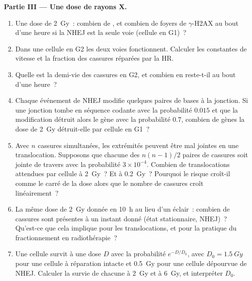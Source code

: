 \begin{problem}
\medskip
\noindent\textbf{Partie III --- Une dose de rayons X.}
\begin{enumerate}[resume]
  \item Une dose de \qty{2}{Gy}~: combien de , et
        combien de foyers de $\gamma$-H2AX au bout d'une heure si la
        NHEJ est la seule voie (cellule en G1)~?
  \item Dans une cellule en G2 les deux voies fonctionnent. Calculer
        les constantes de vitesse et la fraction des cassures réparées
        par la HR.
  \item Quelle est la demi-vie des cassures en G2, et combien en
        reste-t-il au bout d'une heure~?
  \item Chaque événement de NHEJ modifie quelques paires de bases à la
        jonction. Si une jonction tombe en séquence codante avec la
        probabilité $0.015$ et que la modification détruit alors le
        gène avec la probabilité $0.7$, combien de gènes la dose de
        \qty{2}{Gy} détruit-elle par cellule en G1~?
  \item Avec $n$ cassures simultanées, les extrémités peuvent être mal
        jointes en une translocation. Supposons que chacune des
        $n(n-1)/2$ paires de cassures soit jointe de travers avec la
        probabilité $3\times 10^{-4}$. Combien de translocations
        attendues par cellule à \qty{2}{Gy}~? Et à \qty{0.2}{Gy}~?
        Pourquoi le risque croît-il comme le carré de la dose alors que
        le nombre de cassures croît linéairement~?
  \item La même dose de \qty{2}{Gy} donnée en \qty{10}{h} au lieu d'un
        éclair~: combien de cassures sont présentes à un instant donné
        (état stationnaire, NHEJ)~? Qu'est-ce que cela implique pour
        les translocations, et pour la pratique du fractionnement en
        radiothérapie~?
  \item Une cellule survit à une dose $D$ avec la probabilité
        $e^{-D/D_{0}}$, avec $D_{0} = \qty{1.5}{Gy}$ pour une cellule à
        réparation intacte et \qty{0.5}{Gy} pour une cellule dépourvue
        de NHEJ. Calculer la survie de chacune à \qty{2}{Gy} et à
        \qty{6}{Gy}, et interpréter $D_{0}$.
\end{enumerate}


\end{problem}
